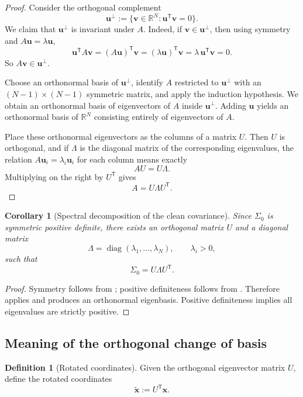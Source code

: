 \documentclass[11pt]{article}
\numberwithin{equation}{section}
\newtheorem{corollary}[theorem]{Corollary}
\theoremstyle{definition}
\newtheorem{definition}[theorem]{Definition}
\theoremstyle{remark}
\newcommand{\R}{\mathbb{R}}
\newcommand{\diag}{\operatorname{diag}}
\newcommand{\trans}{\mathsf{T}}
\begin{document}
\begin{proof}
Consider the orthogonal complement
\[
\mathbf u^\perp:=\{\mathbf v\in\R^N:\mathbf u^\trans\mathbf v=0\}.
\]
We claim that $\mathbf u^\perp$ is invariant under $A$. Indeed, if $\mathbf v\in\mathbf u^\perp$, then using symmetry and $A\mathbf u=\lambda\mathbf u$,
\[
\mathbf u^\trans A\mathbf v = (A\mathbf u)^\trans\mathbf v = (\lambda\mathbf u)^\trans\mathbf v = \lambda\,\mathbf u^\trans\mathbf v = 0.
\]
So $A\mathbf v\in\mathbf u^\perp$.

Choose an orthonormal basis of $\mathbf u^\perp$, identify $A$ restricted to $\mathbf u^\perp$ with an $(N-1)\times(N-1)$ symmetric matrix, and apply the induction hypothesis. We obtain an orthonormal basis of eigenvectors of $A$ inside $\mathbf u^\perp$. Adding $\mathbf u$ yields an orthonormal basis of $\R^N$ consisting entirely of eigenvectors of $A$.

Place these orthonormal eigenvectors as the columns of a matrix $U$. Then $U$ is orthogonal, and if $\Lambda$ is the diagonal matrix of the corresponding eigenvalues, the relation $A\mathbf u_i=\lambda_i\mathbf u_i$ for each column means exactly
\[
AU=U\Lambda.
\]
Multiplying on the right by $U^\trans$ gives
\[
A=U\Lambda U^\trans.
\]
\end{proof}

\begin{corollary}[Spectral decomposition of the clean covariance]\label{cor:sigma0_spectral}
Since $\Sigma_0$ is symmetric positive definite, there exists an orthogonal matrix $U$ and a diagonal matrix
\[
\Lambda=\diag(\lambda_1,\dots,\lambda_N),
\qquad \lambda_i>0,
\]
such that
\begin{equation}\label{eq:sigma0_spectral}
\Sigma_0=U\Lambda U^\trans.
\end{equation}
\end{corollary}

\begin{proof}
Symmetry follows from ; positive definiteness follows from . Therefore  applies and produces an orthonormal eigenbasis. Positive definiteness implies all eigenvalues are strictly positive.
\end{proof}

\subsection{Meaning of the orthogonal change of basis}

\begin{definition}[Rotated coordinates]
Given the orthogonal eigenvector matrix $U$, define the rotated coordinates
\begin{equation}\label{eq:rotated_coords}
\widetilde{\mathbf x}:=U^\trans\mathbf x.
\end{equation}
\end{definition}
\end{document}
